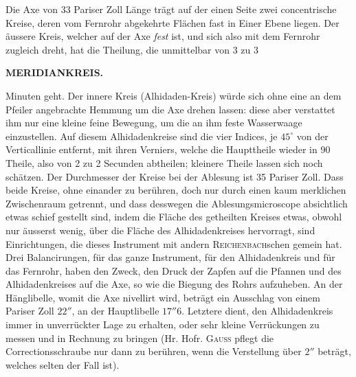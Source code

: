 Die Axe von 33 Pariser Zoll Länge trägt auf der einen Seite zwei concentrische Kreise, deren vom
Fernrohr abgekehrte Flächen fast in Einer Ebene liegen. Der äussere Kreis, welcher auf der Axe
\textit{fest} ist, und sich also mit dem Fernrohr zugleich dreht, hat die Theilung, die unmittelbar
von 3 zu 3\par
{}
\clearpage
\noindent{}%
%
\parbox[t]{\dimexpr\linewidth-24mm\relax}{\centering\footnotesize\bfseries MERIDIANKREIS.\par}%
\makebox[12mm][r]{}\par\nobreak\medskip
\noindent Minuten geht. Der innere Kreis (Alhidaden-Kreis) würde sich ohne eine an dem Pfeiler angebrachte
Hemmung um die Axe drehen lassen: diese aber verstattet ihm nur eine kleine feine Bewegung, um die
an ihm feste Wasserwaage einzustellen. Auf diesem Alhidadenkreise sind die vier Indices, je
$45^\circ$ von der Verticallinie entfernt, mit ihren Verniers, welche die Haupttheile wieder in 90
Theile, also von 2 zu 2 Secunden abtheilen; kleinere Theile lassen sich noch schätzen. Der
Durchmesser der Kreise bei der Ablesung ist 35 Pariser Zoll. Dass beide Kreise, ohne einander zu
berühren, doch nur durch einen kaum merklichen Zwischenraum getrennt, und dass desswegen die
Ablesungsmicroscope absichtlich etwas schief gestellt sind, indem die Fläche des getheilten Kreises
etwas, obwohl nur äusserst wenig, über die Fläche des Alhidadenkreises hervorragt, sind
Einrichtungen, die dieses Instrument mit andern \textsc{Reichenbach}schen gemein hat. Drei
Balancirungen, für das ganze Instrument, für den Alhidadenkreis und für das Fernrohr, haben den
Zweck, den Druck der Zapfen auf die Pfannen und des Alhidadenkreises auf die Axe, so wie die
Biegung des Rohrs aufzuheben. An der Hänglibelle, womit die Axe nivellirt wird, beträgt ein
Ausschlag von einem Pariser Zoll $22''$, an der Hauptlibelle $17''6$. Letztere dient, den
Alhidadenkreis immer in unverrückter Lage zu erhalten, oder sehr kleine Verrückungen zu messen und
in Rechnung zu bringen (Hr. Hofr. \textsc{Gauss} pflegt die Correctionsschraube nur dann zu
berühren, wenn die Verstellung über $2''$ beträgt, welches selten der Fall ist).


